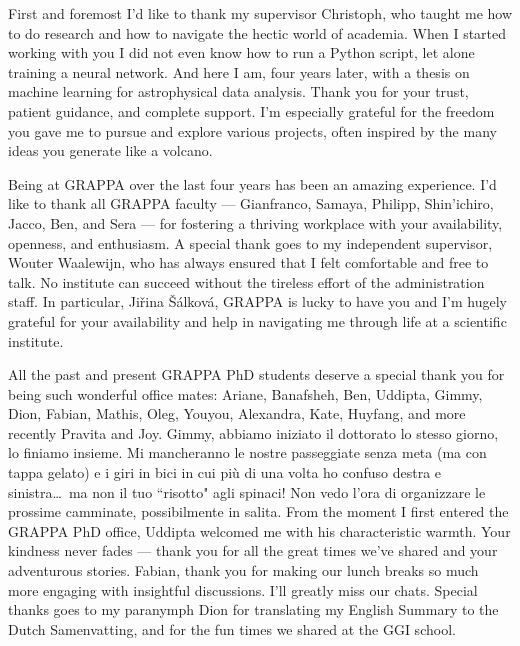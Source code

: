
First and foremost I’d like to thank my supervisor Christoph, who taught me how to do research and how to navigate the hectic world of academia. When I started working with you I did not even know how to run a Python script, let alone training a neural network. And here I am, four years later, with a thesis on machine learning for astrophysical data analysis. Thank you for your trust, patient guidance, and complete support. I’m especially grateful for the freedom you gave me to pursue and explore various projects, often inspired by the many ideas you generate like a volcano.

Being at GRAPPA over the last four years has been an amazing experience. I'd like to thank all GRAPPA faculty --- Gianfranco, Samaya, Philipp, Shin'ichiro, Jacco, Ben, and Sera --- for fostering a thriving workplace with your availability, openness, and enthusiasm. A special thank goes to my independent supervisor, Wouter Waalewijn, who has always ensured that I felt comfortable and free to talk. No institute can succeed without the tireless effort of the administration staff. In particular, Ji\v{r}ina \v{S}\'{a}lkov\'{a}, GRAPPA is lucky to have you and I’m hugely grateful for your availability and help in navigating me through life at a scientific institute.

All the past and present GRAPPA PhD students deserve a special thank you for being such wonderful office mates: Ariane, Banafsheh, Ben, Uddipta, Gimmy, Dion, Fabian, Mathis, Oleg, Youyou, Alexandra, Kate, Huyfang, and more recently Pravita and Joy. 
Gimmy, abbiamo iniziato il dottorato lo stesso giorno, lo finiamo insieme. Mi mancheranno le nostre passeggiate senza meta (ma con tappa gelato) e i giri in bici in cui più di una volta ho confuso destra e sinistra\dots\ ma non il tuo ``risotto" agli spinaci! Non vedo l'ora di organizzare le prossime camminate, possibilmente in salita.
From the moment I first entered the GRAPPA PhD office, Uddipta welcomed me with his characteristic warmth. Your kindness never fades — thank you for all the great times we've shared and your adventurous stories.
Fabian, thank you for making our lunch breaks so much more engaging with insightful discussions. I'll greatly miss our chats.
Special thanks goes to my paranymph Dion for translating my English Summary to the Dutch Samenvatting, and for the fun times we shared at the GGI school. 

